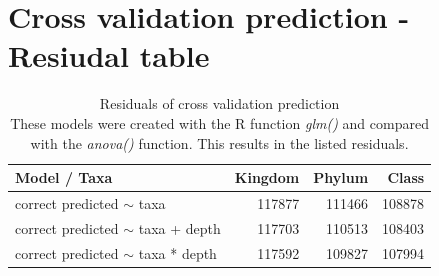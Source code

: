   \section{Cross validation prediction - Resiudal table}
    \begin{table}[h]
      \begin{center}
        \begin{tabular}{ |l|r|r|r| }
          \hline
          \bfseries Model / Taxa &\bfseries  Kingdom & \bfseries Phylum & \bfseries Class \\%
          \hline \hline
          correct predicted $\sim$ taxa & 117877 & \cellcolor{green!30}111466 & \cellcolor{green!45}108878 \\%
          \hline
          correct predicted $\sim$ taxa + depth & 117703 & \cellcolor{green!35}110513 & \cellcolor{green!45}108403 \\%
          \hline
          correct predicted $\sim$ taxa * depth & 117592 & \cellcolor{green!40}109827 & \cellcolor{green!50}107994 \\%
          \hline
        \end{tabular} 
      \end{center}
      \caption{Residuals of cross validation prediction \\
        These models were created with the R function \textit{glm()} and compared with the 
          \textit{anova()} function. This results in the listed residuals.}
      \label{table:Residuals cross validation} 
    \end{table}


